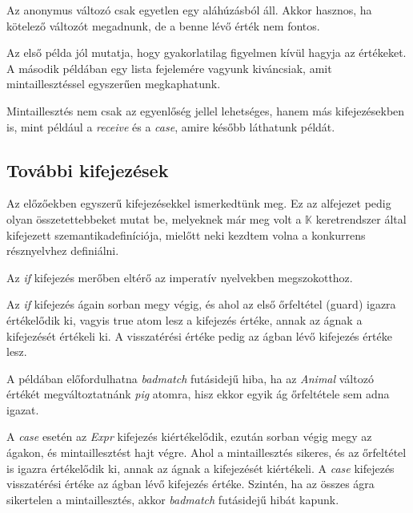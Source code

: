 Az anonymus változó csak egyetlen egy aláhúzásból áll. Akkor hasznos, ha kötelező változót megadnunk, de a benne lévő érték nem fontos.



Az első példa jól mutatja, hogy gyakorlatilag figyelmen kívül hagyja az értékeket. A második példában egy lista fejelemére vagyunk kiváncsiak, amit mintaillesztéssel egyszerűen megkaphatunk.

Mintaillesztés nem csak az egyenlőség jellel lehetséges, hanem más kifejezésekben is, mint például a \textit{receive} és a \textit{case}, amire később láthatunk példát.

\subsection{További kifejezések}

Az előzőekben egyszerű kifejezésekkel ismerkedtünk meg. Ez az alfejezet pedig olyan összetettebbeket mutat be, melyeknek már meg volt a $\mathbb{K}$ keretrendszer által kifejezett szemantikadefiníciója, mielőtt neki kezdtem volna a konkurrens résznyelvhez definiálni.

Az \textit{if} kifejezés merőben eltérő az imperatív nyelvekben megszokotthoz.



Az \textit{if} kifejezés ágain sorban megy végig, és ahol az első őrfeltétel (guard) igazra értékelődik ki, vagyis true atom lesz a kifejezés értéke, annak az ágnak a kifejezését értékeli ki. A visszatérési értéke pedig az ágban lévő kifejezés értéke lesz.



A példában előfordulhatna \textit{badmatch} futásidejű hiba, ha az \textit{Animal} változó értékét megváltoztatnánk \textit{pig} atomra, hisz ekkor egyik ág őrfeltétele sem adna igazat.



A \textit{case} esetén az \textit{Expr} kifejezés kiértékelődik, ezután sorban végig megy az ágakon, és mintaillesztést hajt végre. Ahol a mintaillesztés sikeres, és az őrfeltétel is igazra értékelődik ki, annak az ágnak a kifejezését kiértékeli. A \textit{case} kifejezés visszatérési értéke az ágban lévő kifejezés értéke. Szintén, ha az összes ágra sikertelen a mintaillesztés, akkor \textit{badmatch} futásidejű hibát kapunk.

